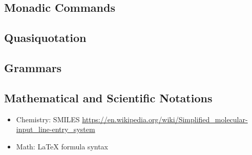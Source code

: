 \subsection{Monadic Commands}\label{sec:syntax-examples-monads}
\subsection{Quasiquotation}\label{sec:syntax-examples-quasiquotation}
\subsection{Grammars}\label{sec:syntax-examples-grammars}
\subsection{Mathematical and Scientific Notations}\label{sec:syntax-examples-math-science}
\begin{itemize}
\item Chemistry: SMILES \url{https://en.wikipedia.org/wiki/Simplified_molecular-input_line-entry_system}
\item Math: LaTeX formula syntax
\end{itemize}